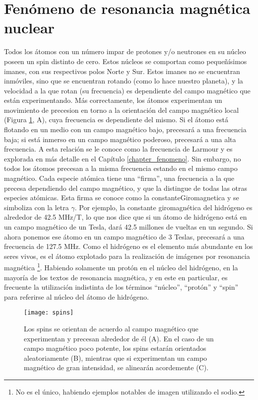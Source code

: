 \section{Fenómeno de resonancia magnética nuclear}
Todos los átomos con un número impar de protones y/o neutrones en su núcleo poseen un spin distinto de cero. Estos núcleos se comportan como pequeñísimos imanes, con sus respectivos polos Norte y Sur. Estos imanes no se encuentran inmóviles, sino que se encuentran rotando (como lo hace nuestro planeta), y la velocidad a la que rotan (su frecuencia) es dependiente del campo magnético que están experimentando. Más correctamente, los átomos experimentan un movimiento de  \gls{precesion} en torno a la orientación del campo magnético local (Figura \ref{fig:spins}, A), cuya frecuencia es dependiente del mismo. Si el átomo está flotando en un medio con un campo magnético bajo, precesará a una frecuencia baja; si está inmerso en un campo magnético poderoso, precesará a una alta frecuencia. A esta relación se le conoce como la frecuencia de Larmour y es explorada en más detalle en el Capítulo \ref{chapter_fenomeno}. Sin embargo, no todos los átomos precesan a la misma frecuencia estando en el mismo campo magnético. Cada especie atómica tiene una ``firma'', una frecuencia a la que precesa dependiendo del campo magnético, y que la distingue de todas las otras especies atómicas. Esta firma se conoce como la  \gls{constanteGiromagnetica} y se simboliza con la letra $\gamma$. Por ejemplo, la constante giromagnética del hidrógeno es alrededor de 42.5 MHz/T, lo que nos dice que si un átomo de hidrógeno está en un campo magnético de un Tesla, dará 42.5 millones de vueltas en un segundo. Si ahora ponemos ese átomo en un campo magnético de 3 Teslas, precesará a una frecuencia de 127.5 MHz. Como el hidrógeno es el elemento más abundante en los seres vivos, es el átomo explotado para la realización de imágenes por resonancia magnética \footnote{No es el único, habiendo ejemplos notables de imagen utilizando el sodio.}. Habiendo solamente un protón en el núcleo del hidrógeno, en la mayoría de los textos de resonancia magnética, y en este en particular, es frecuente la utilización indistinta de los términos ``núcleo'', ``protón'' y ``spin'' para referirse al núcleo del átomo de hidrógeno.

\begin{figure}[htb]
 \centering
 \texttt{[image: spins]}
 \caption{Los spins se orientan de acuerdo al campo magnético que experimentan y precesan alrededor de él (A). En el caso de un campo magnético poco potente, los spins estarán orientados aleatoriamente (B), mientras que si experimentan un campo magnético de gran intensidad, se alinearán acordemente (C).}
 \label{fig:spins}
\end{figure}



